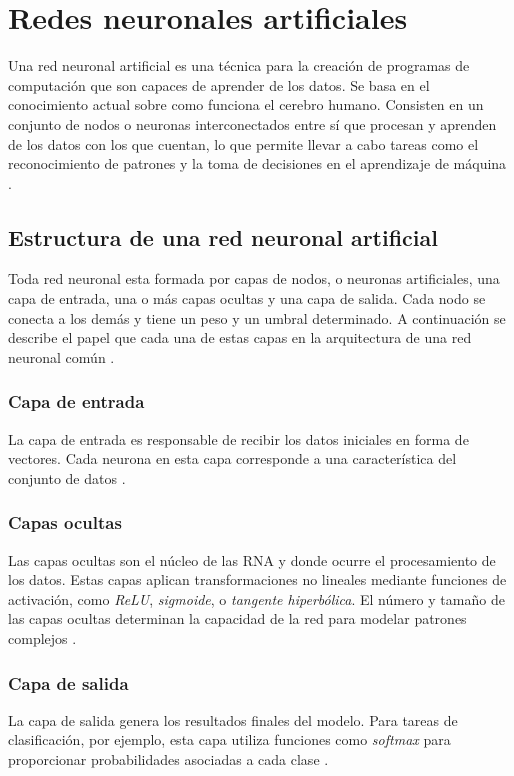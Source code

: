 
\section{Redes neuronales artificiales}

Una red neuronal artificial es una técnica para la creación de programas de computación que son capaces de aprender de los datos. Se basa en el conocimiento actual sobre como funciona el cerebro humano. 
Consisten en un conjunto de nodos o neuronas interconectados entre sí que procesan y aprenden de los datos con los que cuentan, lo que permite llevar a cabo tareas como el reconocimiento de patrones y la toma de decisiones en el aprendizaje de máquina \cite{L10}.


\subsection{Estructura de una red neuronal artificial}
Toda red neuronal esta formada por capas de nodos, o neuronas artificiales, una capa de entrada, una o más capas ocultas y una capa de salida. Cada nodo se conecta a los demás y tiene un peso y un umbral determinado.
A continuación se describe el papel que cada una de estas capas en la arquitectura de una red neuronal común \cite{L11}.

\subsubsection{Capa de entrada}
La capa de entrada es responsable de recibir los datos iniciales en forma de vectores. Cada neurona en esta capa corresponde a una característica del conjunto de datos \cite{L12}.

\subsubsection{Capas ocultas}
Las capas ocultas son el núcleo de las RNA y donde ocurre el procesamiento de los datos. Estas capas aplican transformaciones no lineales mediante funciones de activación, como \textit{ReLU}, \textit{sigmoide}, o \textit{tangente hiperbólica}. El número y tamaño de las capas ocultas determinan la capacidad de la red para modelar patrones complejos \cite{L12}.

\subsubsection{Capa de salida}
La capa de salida genera los resultados finales del modelo. Para tareas de clasificación, por ejemplo, esta capa utiliza funciones como \textit{softmax} para proporcionar probabilidades asociadas a cada clase \cite{L12}.

